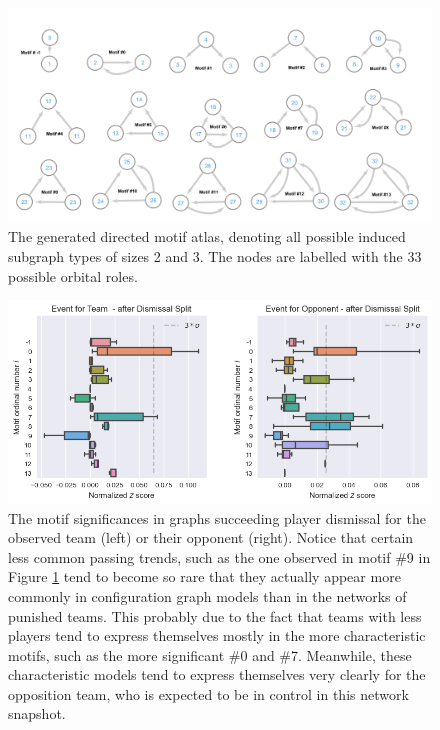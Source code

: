 \documentclass[9pt,twocolumn,twoside]{pnas-report}
\begin{document}
\begin{figure}[t]\centering
	\includegraphics[width=\linewidth]{motifs.png}
	\caption{The generated directed motif atlas, denoting all possible induced subgraph types of sizes 2 and 3. The nodes are labelled with the 33 possible orbital roles.}
	\label{fig:motifs}
\end{figure}

\begin{figure}[t]\centering
	\includegraphics[width=\linewidth]{MotifSignificanceDismissal.png}
	\caption{The motif significances in graphs succeeding player dismissal for the observed team (left) or their opponent (right). Notice that certain less common passing trends, such as the one observed in motif \#9 in Figure \ref{fig:motifs} tend to become so rare that they actually appear more commonly in configuration graph models than in the networks of punished teams. This probably due to the fact that teams with less players tend to express themselves mostly in the more characteristic motifs, such as the more significant \#0 and \#7. Meanwhile, these characteristic models tend to express themselves very clearly for the opposition team, who is expected to be in control in this network snapshot.}
	\label{fig:MotifSignificanceDismissal}
\end{figure}
\end{document}
